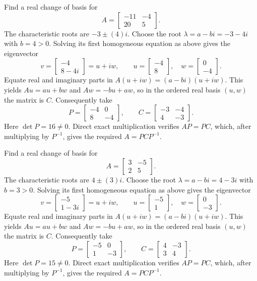 \goal Find a real change of basis for
\[A=\begin{bmatrix}-11&-4\\20&5\end{bmatrix}.\]
The characteristic roots are $-3\pm(4)i$. Choose the root $\lambda=a-bi=-3 - 4 i$ with $b=4>0$. Solving its first homogeneous equation as above gives the eigenvector
\[v=\begin{bmatrix}-4\\8 - 4 i\end{bmatrix}=u+iw,\qquad u=\begin{bmatrix}-4\\8\end{bmatrix},\quad w=\begin{bmatrix}0\\-4\end{bmatrix}.\]
Equate real and imaginary parts in $A(u+iw)=(a-bi)(u+iw)$. This yields $Au=au+bw$ and $Aw=-bu+aw$, so in the ordered real basis $(u,w)$ the matrix is $C$. Consequently take
\[P=\begin{bmatrix}-4&0\\8&-4\end{bmatrix},\qquad C=\begin{bmatrix}-3&-4\\4&-3\end{bmatrix}.\]
Here $\det P=16\ne0$. Direct exact multiplication verifies $AP=PC$, which, after multiplying by $P^{-1}$, gives the required $A=PCP^{-1}$.


\goal Find a real change of basis for
\[A=\begin{bmatrix}3&-5\\2&5\end{bmatrix}.\]
The characteristic roots are $4\pm(3)i$. Choose the root $\lambda=a-bi=4 - 3 i$ with $b=3>0$. Solving its first homogeneous equation as above gives the eigenvector
\[v=\begin{bmatrix}-5\\1 - 3 i\end{bmatrix}=u+iw,\qquad u=\begin{bmatrix}-5\\1\end{bmatrix},\quad w=\begin{bmatrix}0\\-3\end{bmatrix}.\]
Equate real and imaginary parts in $A(u+iw)=(a-bi)(u+iw)$. This yields $Au=au+bw$ and $Aw=-bu+aw$, so in the ordered real basis $(u,w)$ the matrix is $C$. Consequently take
\[P=\begin{bmatrix}-5&0\\1&-3\end{bmatrix},\qquad C=\begin{bmatrix}4&-3\\3&4\end{bmatrix}.\]
Here $\det P=15\ne0$. Direct exact multiplication verifies $AP=PC$, which, after multiplying by $P^{-1}$, gives the required $A=PCP^{-1}$.


